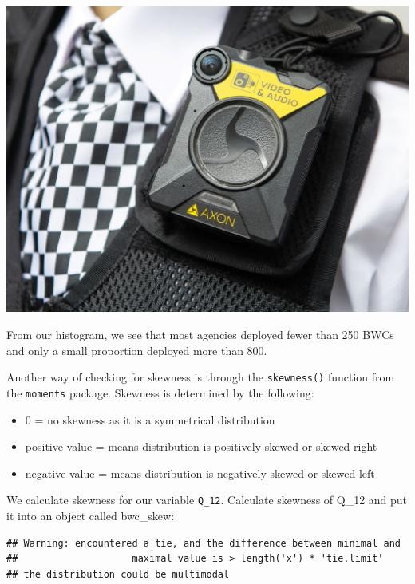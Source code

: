 \documentclass[
]{book}
\newenvironment{Shaded}{\begin{snugshade}}{\end{snugshade}}
\newcommand{\AttributeTok}[1]{\textcolor[rgb]{0.77,0.63,0.00}{#1}}
\newcommand{\ConstantTok}[1]{\textcolor[rgb]{0.00,0.00,0.00}{#1}}
\newcommand{\FunctionTok}[1]{\textcolor[rgb]{0.00,0.00,0.00}{#1}}
\newcommand{\NormalTok}[1]{#1}
\newcommand{\OtherTok}[1]{\textcolor[rgb]{0.56,0.35,0.01}{#1}}
\newcommand{\SpecialCharTok}[1]{\textcolor[rgb]{0.00,0.00,0.00}{#1}}
\providecommand{\tightlist}{%
  \setlength{\itemsep}{0pt}\setlength{\parskip}{0pt}}
\begin{document}
\includegraphics{Images/bwcs.jpg}

From our histogram, we see that most agencies deployed fewer than 250 BWCs and only a small proportion deployed more than 800.

Another way of checking for skewness is through the \texttt{skewness()} function from the \texttt{moments} package. Skewness is determined by the following:

\begin{itemize}
\tightlist
\item
  0 = no skewness as it is a symmetrical distribution
\item
  positive value = means distribution is positively skewed or skewed right
\item
  negative value = means distribution is negatively skewed or skewed left
\end{itemize}

We calculate skewness for our variable \texttt{Q\_12}. Calculate skewness of Q\_12 and put it into an object called bwc\_skew:

\begin{Shaded}
\end{Shaded}

\begin{verbatim}
## Warning: encountered a tie, and the difference between minimal and 
##                    maximal value is > length('x') * 'tie.limit'
## the distribution could be multimodal
\end{verbatim}
\end{document}
